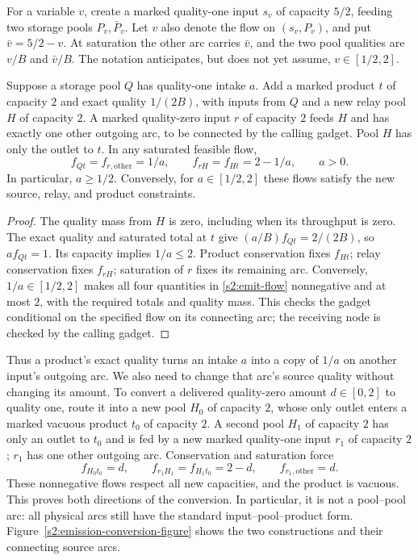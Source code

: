 For a variable $v$, create a marked quality-one input $s_v$ of capacity
$5/2$, feeding two storage pools $P_v,\bar P_v$. Let $v$ also denote
the flow on $(s_v,P_v)$, and put $\bar v=5/2-v$. At saturation the
other arc carries $\bar v$, and the two pool qualities are $v/B$ and
$\bar v/B$. The notation anticipates, but does not yet assume,
$v\in[1/2,2]$.

\begin{lemma}\label{s2:emission}
Suppose a storage pool $Q$ has quality-one intake $a$. Add a marked
product $t$ of capacity $2$ and exact quality $1/(2B)$, with inputs
from $Q$ and a new relay pool $H$ of capacity $2$. A marked quality-zero
input $r$ of capacity $2$ feeds $H$ and has exactly one other outgoing
arc, to be connected by the calling gadget. Pool $H$ has only the outlet
to $t$. In any saturated feasible flow,
\begin{equation}
 f_{Qt}=f_{r,\mathrm{other}}=1/a,\qquad
 f_{rH}=f_{Ht}=2-1/a,\qquad a>0.\label{s2:emit-flow}
\end{equation}
In particular, $a\ge1/2$. Conversely, for $a\in[1/2,2]$ these flows
satisfy the new source, relay, and product constraints.
\end{lemma}
\begin{proof}
The quality mass from $H$ is zero, including when its throughput is zero.
The exact quality and saturated total at $t$ give
$(a/B)f_{Qt}=2/(2B)$, so $af_{Qt}=1$.
Its capacity implies $1/a\le2$. Product conservation fixes $f_{Ht}$;
relay conservation fixes $f_{rH}$; saturation of $r$ fixes its remaining
arc. Conversely, $1/a\in[1/2,2]$ makes all four quantities in
\eqref{s2:emit-flow} nonnegative and at most $2$, with the required
totals and quality mass. This checks the gadget conditional on the
specified flow on its connecting arc; the receiving node is checked
by the calling gadget.
\end{proof}

Thus a product's exact quality turns an intake $a$ into a copy of $1/a$
on another input's outgoing arc. We also need to change that arc's source
quality without changing its amount. To convert a delivered quality-zero
amount $d\in[0,2]$ to quality one, route it into a new pool $H_0$ of
capacity $2$, whose only outlet enters a marked vacuous product $t_0$
of capacity $2$. A second pool $H_1$ of capacity $2$ has only an outlet
to $t_0$ and is fed by a new marked quality-one input $r_1$ of capacity
$2$; $r_1$ has one other outgoing arc. Conservation and saturation force
\begin{equation}
 f_{H_0t_0}=d,\qquad f_{r_1H_1}=f_{H_1t_0}=2-d,
 \qquad f_{r_1,\mathrm{other}}=d.\label{s2:flip}
\end{equation}
These nonnegative flows respect all new capacities, and the product is
vacuous. This proves both directions of the conversion. In particular,
it is not a pool--pool arc: all physical arcs still have the standard
input--pool--product form. Figure~\ref{s2:emission-conversion-figure}
shows the two constructions and their connecting source arcs.

